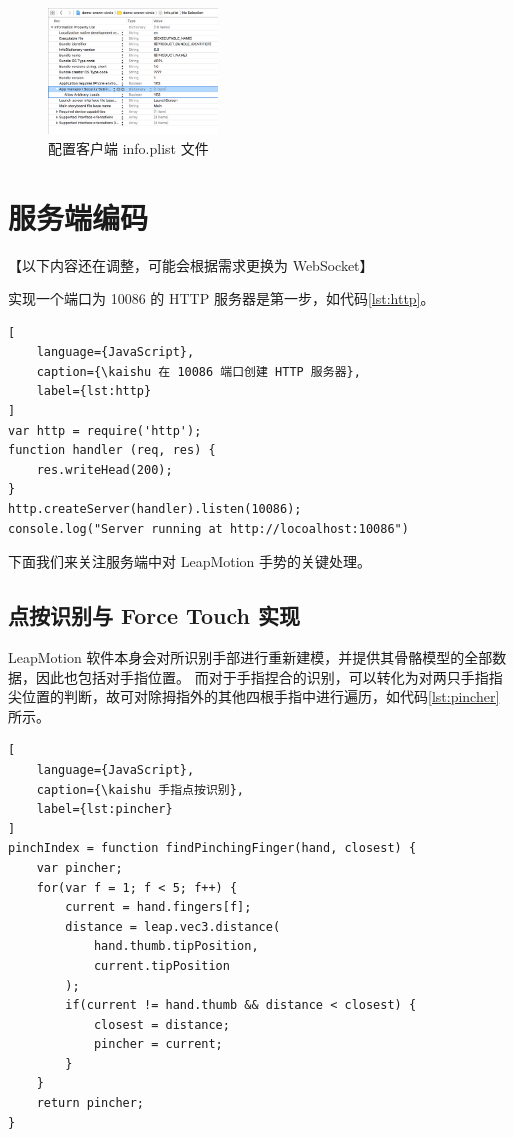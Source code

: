 \begin{figure}[H]
    \kaishu
    \centering
    \includegraphics[width=0.4\textwidth]{figures/config}
    \caption{\kaishu 配置客户端 info.plist 文件}
    \label{fig:config}
\end{figure}

\section{服务端编码}

【以下内容还在调整，可能会根据需求更换为 WebSocket】

实现一个端口为 10086 的 HTTP 服务器是第一步，如代码\ref{lst:http}。
\begin{lstlisting}[
    language={JavaScript},
    caption={\kaishu 在 10086 端口创建 HTTP 服务器},
    label={lst:http}
]
var http = require('http');
function handler (req, res) {
    res.writeHead(200);
}
http.createServer(handler).listen(10086);
console.log("Server running at http://locoalhost:10086")
\end{lstlisting}

下面我们来关注服务端中对 LeapMotion 手势的关键处理。

\subsection{点按识别与 Force Touch 实现}

LeapMotion 软件本身会对所识别手部进行重新建模，并提供其骨骼模型的全部数据，因此也包括对手指位置。
而对于手指捏合的识别，可以转化为对两只手指指尖位置的判断，故可对除拇指外的其他四根手指中进行遍历，如代码\ref{lst:pincher} 所示。

\begin{lstlisting}[
    language={JavaScript},
    caption={\kaishu 手指点按识别},
    label={lst:pincher}
]
pinchIndex = function findPinchingFinger(hand, closest) {
    var pincher;
    for(var f = 1; f < 5; f++) {
        current = hand.fingers[f];
        distance = leap.vec3.distance(
            hand.thumb.tipPosition,
            current.tipPosition
        );
        if(current != hand.thumb && distance < closest) {
            closest = distance;
            pincher = current;
        }
    }
    return pincher;
}
\end{lstlisting}

